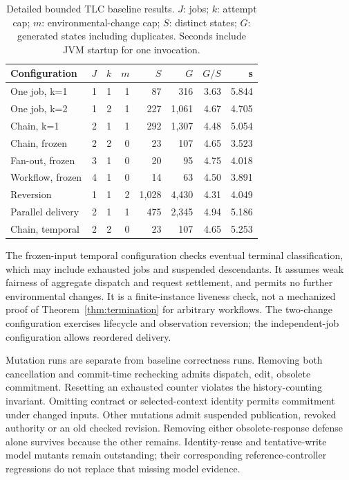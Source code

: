 \documentclass[pdflatex,sn-mathphys-num]{sn-jnl}
\theoremstyle{thmstyleone}
\theoremstyle{thmstylethree}
\theoremstyle{thmstyletwo}
\begin{document}
\begin{table}[tbp]
\centering
\caption{Detailed bounded TLC baseline results. $J$: jobs; $k$: attempt cap; $m$: environmental-change cap; $S$: distinct states; $G$: generated states including duplicates. Seconds include JVM startup for one invocation.}\label{tab:exploration}
\footnotesize
\setlength{\tabcolsep}{3pt}
\renewcommand{\arraystretch}{1.13}
\begin{tabularx}{\linewidth}{@{}Xrrrrrrr@{}}\toprule
Configuration & $J$ & $k$ & $m$ & $S$ & $G$ & $G/S$ & s\\\midrule
One job, k=1 & 1 & 1 & 1 & 87 & 316 & 3.63 & 5.844\\
One job, k=2 & 1 & 2 & 1 & 227 & 1,061 & 4.67 & 4.705\\
Chain, k=1 & 2 & 1 & 1 & 292 & 1,307 & 4.48 & 5.054\\
Chain, frozen & 2 & 2 & 0 & 23 & 107 & 4.65 & 3.523\\
Fan-out, frozen & 3 & 1 & 0 & 20 & 95 & 4.75 & 4.018\\
Workflow, frozen & 4 & 1 & 0 & 14 & 63 & 4.50 & 3.891\\
Reversion & 1 & 1 & 2 & 1,028 & 4,430 & 4.31 & 4.049\\
Parallel delivery & 2 & 1 & 1 & 475 & 2,345 & 4.94 & 5.186\\
Chain, temporal & 2 & 2 & 0 & 23 & 107 & 4.65 & 5.253\\
\bottomrule\end{tabularx}
\end{table}

The frozen-input temporal configuration checks eventual terminal classification, which may include exhausted jobs and suspended descendants. It assumes weak fairness of aggregate dispatch and request settlement, and permits no further environmental changes. It is a finite-instance liveness check, not a mechanized proof of Theorem~\ref{thm:termination} for arbitrary workflows. The two-change configuration exercises lifecycle and observation reversion; the independent-job configuration allows reordered delivery.

Mutation runs are separate from baseline correctness runs. Removing both cancellation and commit-time rechecking admits dispatch, edit, obsolete commitment. Resetting an exhausted counter violates the history-counting invariant. Omitting contract or selected-context identity permits commitment under changed inputs. Other mutations admit suspended publication, revoked authority or an old checked revision. Removing either obsolete-response defense alone survives because the other remains. Identity-reuse and tentative-write model mutants remain outstanding; their corresponding reference-controller regressions do not replace that missing model evidence.
\end{document}
